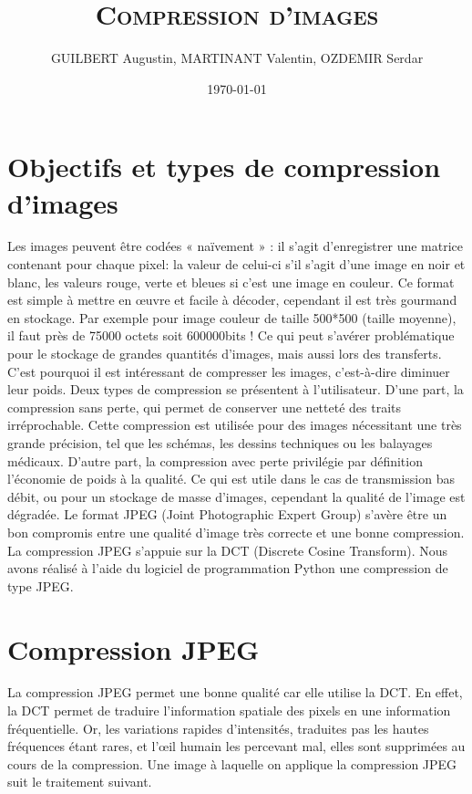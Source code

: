 \documentclass[12pt]{article}
\author{GUILBERT Augustin, MARTINANT Valentin, OZDEMIR Serdar}
\date{\today}
\title{\textsc{\textbf{Compression d'images}}}
\begin{document}
\maketitle
\newpage
\tableofcontents
\newpage
\section{Objectifs et types de compression d'images}	
Les images peuvent être codées « naïvement » : il s’agit d’enregistrer une matrice contenant pour chaque pixel: la valeur de celui-ci s’il s’agit d’une image en noir et blanc, les valeurs rouge, verte et bleues si c’est une image en couleur. Ce format est simple à mettre en œuvre et facile à décoder, cependant il est très gourmand en stockage.  Par exemple pour image couleur de taille 500*500 (taille moyenne), il faut près de 75000 octets soit 600000bits ! Ce qui peut s’avérer problématique pour le stockage de grandes quantités d’images, mais aussi lors des transferts. C’est pourquoi il est intéressant de compresser les images, c’est-à-dire diminuer leur poids. Deux types de compression se présentent à l’utilisateur.
D’une part, la compression sans perte, qui permet de conserver une netteté des traits irréprochable. Cette compression est utilisée pour des images nécessitant une très grande précision, tel que les schémas, les dessins techniques ou les balayages médicaux.
D’autre part, la compression avec perte privilégie par définition l’économie de poids à la qualité. Ce qui est utile dans le cas de transmission bas débit, ou pour un stockage de masse d’images, cependant la qualité de l’image est dégradée. Le format JPEG (Joint Photographic Expert Group) s’avère être un bon compromis entre une qualité d’image très correcte et une bonne compression. La compression JPEG s’appuie sur la DCT (Discrete Cosine Transform).
Nous avons réalisé à l’aide du logiciel de programmation Python une compression de type JPEG.


\newpage
\section{Compression JPEG}
La compression JPEG permet une bonne qualité car elle utilise la DCT. En effet, la DCT permet de traduire l'information spatiale des pixels en une information fréquentielle. Or, les variations rapides d’intensités, traduites pas les hautes fréquences étant rares, et l’œil humain les percevant mal, elles sont supprimées au cours de la compression. Une image à laquelle on applique la compression JPEG suit le traitement suivant.
\end{document}
